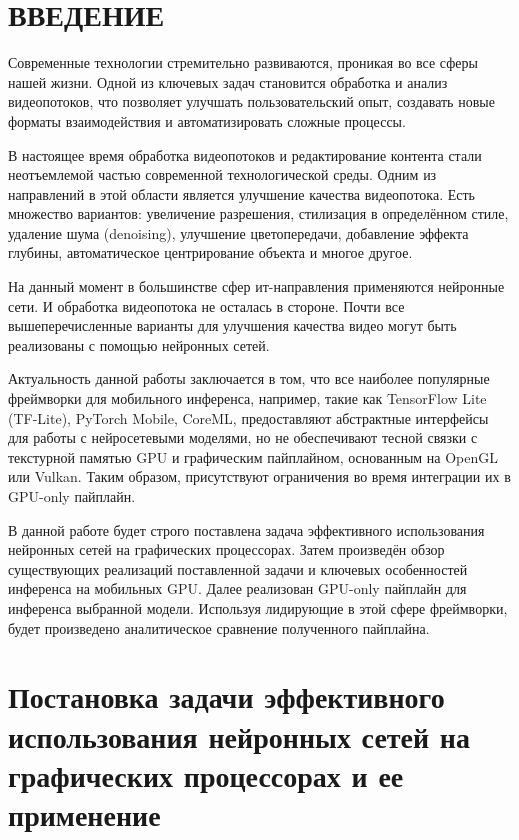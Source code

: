 \documentclass[a4paper,14pt]{extreport}
\begin{document}
    \renewcommand\contentsname{\large СОДЕРЖАНИЕ}
    
    \tableofcontents\newpage
    \chapter*{ВВЕДЕНИЕ}
    Современные технологии стремительно развиваются, проникая во все сферы нашей жизни. Одной из ключевых задач становится обработка и анализ видеопотоков, что позволяет улучшать пользовательский опыт, создавать новые форматы взаимодействия и автоматизировать сложные процессы.
    
    В настоящее время обработка видеопотоков и редактирование контента стали неотъемлемой частью современной технологической среды. Одним из направлений в этой области является улучшение качества видеопотока. Есть множество вариантов: увеличение разрешения, стилизация в определённом стиле, удаление шума (denoising), улучшение цветопередачи, добавление эффекта глубины, автоматическое центрирование объекта и многое другое.

    На данный момент в большинстве сфер ит-направления применяются нейронные сети. И обработка видеопотока не осталась в стороне. Почти все вышеперечисленные варианты для улучшения качества видео могут быть реализованы с помощью нейронных сетей.

    Актуальность данной работы заключается в том, что все наиболее популярные фреймворки для мобильного инференса, например, такие как TensorFlow Lite (TF-Lite), PyTorch Mobile, CoreML, предоставляют абстрактные интерфейсы для работы с нейросетевыми моделями, но не обеспечивают тесной связки с текстурной памятью GPU и графическим пайплайном, основанным на OpenGL или Vulkan. Таким образом, присутствуют ограничения во время интеграции их в GPU-only пайплайн.

    В данной работе будет строго поставлена задача эффективного использования нейронных сетей на графических процессорах. Затем произведён обзор существующих реализаций поставленной задачи и ключевых особенностей инференса на мобильных GPU. Далее реализован GPU-only пайплайн для инференса выбранной модели. Используя лидирующие в этой сфере фреймворки, будет произведено аналитическое сравнение полученного пайплайна.

    \chapter{Постановка задачи эффективного использования нейронных сетей на
графических процессорах и ее применение}
\end{document}
